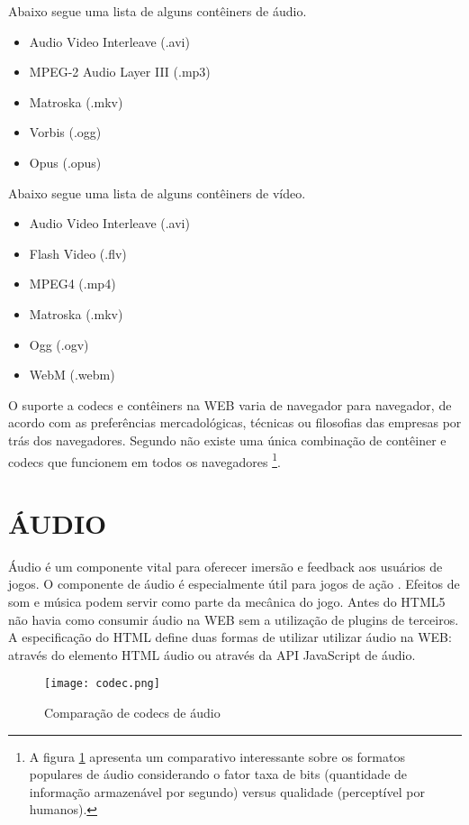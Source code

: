 Abaixo segue uma lista de alguns contêiners de áudio.
\begin{itemize}
    \item Audio Video Interleave (.avi)
    \item MPEG-2 Audio Layer III (.mp3)
    \item Matroska (.mkv)
    \item Vorbis (.ogg)
    \item Opus (.opus)
\end{itemize}

Abaixo segue uma lista de alguns contêiners de vídeo.
\begin{itemize}
    \item Audio Video Interleave (.avi)
    \item Flash Video (.flv)
    \item MPEG4 (.mp4)
    \item Matroska (.mkv)
    \item Ogg (.ogv)
    \item WebM (.webm)
\end{itemize}

O suporte a codecs e contêiners na WEB varia de navegador para
navegador, de acordo com as preferências mercadológicas, técnicas
ou filosofias das empresas por trás dos navegadores. Segundo
\cite{diveIntohtml} não existe uma única combinação de contêiner e
codecs que funcionem em todos os navegadores
\footnote{A figura \ref{fig:audioCodecs} apresenta um comparativo interessante
sobre os formatos populares de áudio considerando o fator taxa de bits
(quantidade de informação armazenável por segundo) versus qualidade
(perceptível por humanos).}.

\section{ÁUDIO}

Áudio é um componente vital para oferecer imersão e feedback aos
usuários de jogos. O componente de áudio é especialmente útil para
jogos de ação \autocite{browserGamesTechnologyAndFuture}. Efeitos
de som e música podem servir como parte da mecânica do jogo. Antes
do HTML5 não havia como consumir áudio na WEB sem a utilização de
plugins de terceiros. A especificação do HTML define duas formas de
utilizar utilizar áudio na WEB: através do elemento HTML áudio ou
através da API JavaScript de áudio.

\begin{figure}
    \centering
    \texttt{[image: codec.png]}
	\caption{Comparação de codecs de áudio}
    \label{fig:audioCodecs}
\end{figure}

